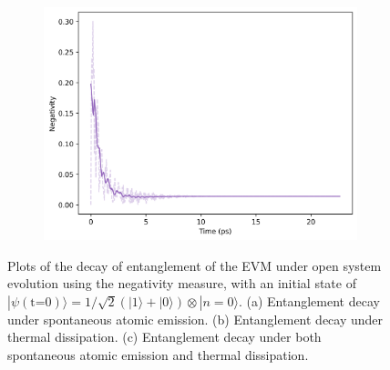 \documentclass[11pt]{article}
\begin{document}
\begin{figure}[H]
    \vspace{0.5cm}
    
    \begin{subfigure}{0.45\textwidth}
        \centering
        \includegraphics[width=\linewidth]{Research Project/Code/results/ExVib/Open/Negativity/neg_both_eg.png}
        \caption{}
        \label{fig:EVM_OQS_Neg_both_eg}
    \end{subfigure}
    \hfill

    \caption{Plots of the decay of entanglement of the EVM under open system evolution using the negativity measure, with an initial state of $|\psi (\text{t=0})\rangle = 1/\sqrt{2}(|1\rangle + |0\rangle)\otimes|n=0\rangle$. (a) Entanglement decay under spontaneous atomic emission. (b) Entanglement decay under thermal dissipation. (c) Entanglement decay under both spontaneous atomic emission and thermal dissipation.}
    \label{fig:EVM_OQS_Neg_eg}
\end{figure}
\end{document}
